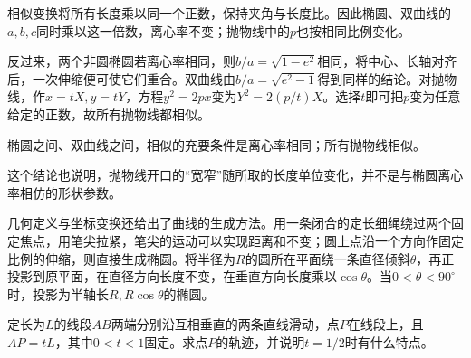 相似变换将所有长度乘以同一个正数，保持夹角与长度比。因此椭圆、双曲线的\(a,b,c\)同时乘以这一倍数，离心率不变；抛物线中的\(p\)也按相同比例变化。

反过来，两个非圆椭圆若离心率相同，则\(b/a=\sqrt{1-e^2}\)相同，将中心、长轴对齐后，一次伸缩便可使它们重合。双曲线由\(b/a=\sqrt{e^2-1}\)得到同样的结论。对抛物线，作\(x=tX,y=tY\)，方程\(y^2=2px\)变为\(Y^2=2(p/t)X\)。选择\(t\)即可把\(p\)变为任意给定的正数，故所有抛物线都相似。

\begin{samepage}
\begin{proposition}
椭圆之间、双曲线之间，相似的充要条件是离心率相同；所有抛物线相似。
\end{proposition}
\end{samepage}

这个结论也说明，抛物线开口的“宽窄”随所取的长度单位变化，并不是与椭圆离心率相仿的形状参数。

几何定义与坐标变换还给出了曲线的生成方法。用一条闭合的定长细绳绕过两个固定焦点，用笔尖拉紧，笔尖的运动可以实现距离和不变；圆上点沿一个方向作固定比例的伸缩，则直接生成椭圆。将半径为\(R\)的圆所在平面绕一条直径倾斜\(\theta\)，再正投影到原平面，在直径方向长度不变，在垂直方向长度乘以\(\cos\theta\)。当\(0<\theta<90^\circ\)时，投影为半轴长\(R,R\cos\theta\)的椭圆。

\begin{samepage}
\begin{example}
定长为\(L\)的线段\(AB\)两端分别沿互相垂直的两条直线滑动，点\(P\)在线段上，且\(AP=tL\)，其中\(0<t<1\)固定。求点\(P\)的轨迹，并说明\(t=1/2\)时有什么特点。
\end{example}
\end{samepage}

